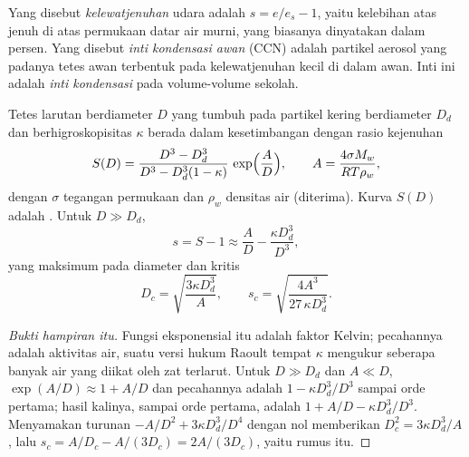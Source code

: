 \begin{definition}\label{def:b2:atmospheric-thermodynamics:microphysics}
Yang disebut \emph{kelewatjenuhan} udara adalah $s = e/e_s - 1$, yaitu kelebihan
 atas  jenuh di atas permukaan datar air murni, yang biasanya
dinyatakan dalam persen. Yang disebut \emph{inti kondensasi awan} (CCN)
adalah partikel aerosol yang padanya tetes awan terbentuk pada kelewatjenuhan kecil di dalam awan.
Inti ini adalah \emph{inti kondensasi} pada volume-volume sekolah.
\end{definition}

\begin{proposition}\label{prop:b2:atmospheric-thermodynamics:kohler}
Tetes larutan berdiameter $D$ yang tumbuh pada partikel kering berdiameter $D_d$ dan berhigroskopisitas
$\kappa$ berada dalam kesetimbangan dengan rasio kejenuhan
\[
  S(D) = \frac{D^3 - D_d^3}{D^3 - D_d^3(1 - \kappa)}\,\exp\Bigl(\frac{A}{D}\Bigr), \qquad
  A = \frac{4\sigma M_w}{R T\rho_w},
\]
dengan $\sigma$ tegangan permukaan dan $\rho_w$ densitas air (diterima). Kurva $S(D)$
adalah \emph{}. Untuk $D \gg D_d$,
\[
  s = S - 1 \approx \frac{A}{D} - \frac{\kappa D_d^3}{D^3},
\]
yang maksimum pada diameter dan  kritis
\[
  D_c = \sqrt{\frac{3\kappa D_d^3}{A}}, \qquad s_c = \sqrt{\frac{4A^3}{27\,\kappa D_d^3}} .
\]
\end{proposition}

\begin{proof}[Bukti hampiran itu]
Fungsi eksponensial itu adalah faktor Kelvin; pecahannya adalah aktivitas air, suatu versi hukum
Raoult tempat $\kappa$ mengukur seberapa banyak air yang diikat oleh zat terlarut. Untuk $D \gg D_d$ dan
$A \ll D$, $\exp(A/D) \approx 1 + A/D$ dan pecahannya adalah $1 - \kappa D_d^3/D^3$ sampai orde
pertama; hasil kalinya, sampai orde pertama, adalah $1 + A/D - \kappa D_d^3/D^3$. Menyamakan turunan
$-A/D^2 + 3\kappa D_d^3/D^4$ dengan nol memberikan $D_c^2 = 3\kappa D_d^3/A$, lalu $s_c = A/D_c -
A/(3D_c) = 2A/(3D_c)$, yaitu rumus itu.
\end{proof}

